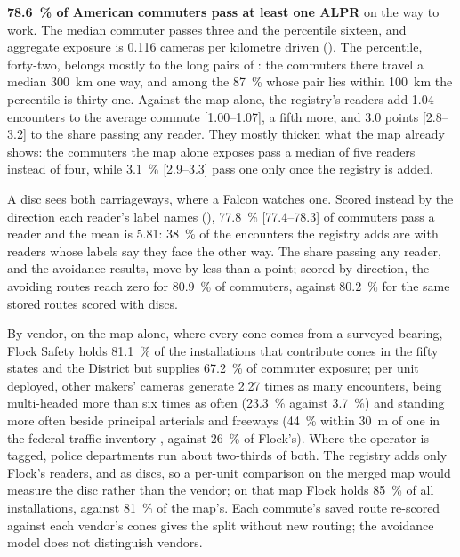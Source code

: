\documentclass[11pt,twoside]{article}
\newcommand{\alpr}{ALPR\xspace}
\begin{document}
\textbf{\SI{78.6}{\percent} of American commuters pass at least one \alpr} on the way to
work. The median commuter passes three and the  percentile sixteen, and aggregate
exposure is \num{0.116} cameras per kilometre driven (). The 
percentile, forty-two, belongs mostly to the long pairs of : the
commuters there travel a median \SI{300}{\kilo\metre} one way, and among the
\SI{87}{\percent} whose pair lies within \SI{100}{\kilo\metre} the  percentile is
thirty-one. Against the map alone, the registry's readers add \num{1.04}
encounters to the average commute [1.00--1.07], a fifth more, and \num{3.0} points
[2.8--3.2] to the share passing any reader. They mostly thicken what the map already shows:
the commuters the map alone exposes pass a median of five readers instead of four, while
\SI{3.1}{\percent} [2.9--3.3] pass one only once the registry is added.

A disc sees both carriageways, where a Falcon watches one. Scored instead by the direction
each reader's label names (), \SI{77.8}{\percent} [77.4--78.3] of
commuters pass a reader and the mean is \num{5.81}: \SI{38}{\percent} of the encounters the
registry adds are with readers whose labels say they face the other way. The share passing any
reader, and the avoidance results, move by less than a point; scored by direction, the avoiding
routes reach zero for \SI{80.9}{\percent} of commuters, against \SI{80.2}{\percent} for the same
stored routes scored with discs.

By vendor, on the map alone, where every cone comes from a surveyed bearing, Flock Safety
holds \SI{81.1}{\percent} of the installations that contribute cones in the fifty states and
the District but supplies \SI{67.2}{\percent} of commuter exposure; per unit deployed, other
makers' cameras generate \num{2.27} times as many encounters, being multi-headed more than six
times as often (\SI{23.3}{\percent} against \SI{3.7}{\percent}) and standing more often beside principal
arterials and freeways (\SI{44}{\percent} within \SI{30}{\metre} of one in the federal traffic
inventory \citep{hpms2024}, against \SI{26}{\percent} of Flock's). Where the operator is
tagged, police departments run about two-thirds of both. The registry adds only Flock's
readers, and as discs, so a per-unit comparison on the merged map would measure the disc
rather than the vendor; on that map Flock holds \SI{85}{\percent} of all installations,
against \SI{81}{\percent} of the map's. Each
commute's saved route re-scored against each vendor's cones gives the split without new
routing; the avoidance model does not distinguish vendors.
\end{document}

